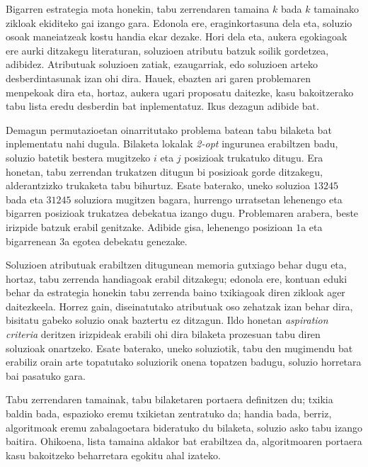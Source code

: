 \documentclass[eu]{ifirak}\usepackage[]{graphicx}\usepackage[]{color}
\begin{document}
Bigarren estrategia mota honekin, tabu zerrendaren tamaina $k$ bada $k$ tamainako zikloak ekiditeko gai izango gara. Edonola ere, eraginkortasuna dela eta, soluzio osoak maneiatzeak kostu handia ekar dezake. Hori dela eta, aukera egokiagoak ere aurki ditzakegu literaturan, soluzioen atributu batzuk soilik gordetzea, adibidez. Atributuak soluzioen zatiak, ezaugarriak, edo soluzioen arteko desberdintasunak izan ohi dira. Hauek, ebazten ari garen problemaren menpekoak dira eta, hortaz, aukera ugari proposatu daitezke, kasu bakoitzerako tabu lista eredu desberdin bat inplementatuz. Ikus dezagun adibide bat.

\begin{tcolorbox}
\begin{ifexample}
Demagun permutazioetan oinarritutako problema batean tabu bilaketa bat inplementatu nahi dugula. Bilaketa lokalak {\em 2-opt} ingurunea erabiltzen badu, soluzio batetik bestera mugitzeko $i$ eta $j$ posizioak trukatuko ditugu. Era honetan, tabu zerrendan trukatzen ditugun bi posizioak gorde ditzakegu, alderantzizko trukaketa tabu bihurtuz. Esate baterako, uneko soluzioa $13245$ bada eta $31245$ soluziora mugitzen bagara, hurrengo urratsetan lehenengo eta bigarren posizioak trukatzea debekatua izango dugu. Problemaren arabera, beste irizpide batzuk erabil genitzake. Adibide gisa, lehenengo posizioan $1$a eta bigarrenean $3$a egotea debekatu genezake.
\end{ifexample}
\end{tcolorbox}

Soluzioen atributuak erabiltzen ditugunean memoria gutxiago behar dugu eta, hortaz, tabu zerrenda handiagoak erabil ditzakegu; edonola ere, kontuan eduki behar da estrategia honekin tabu zerrenda baino txikiagoak diren zikloak ager daitezkeela. Horrez gain, diseinatutako atributuak oso zehatzak izan behar dira, bisitatu gabeko soluzio onak baztertu ez ditzagun. Ildo honetan \textit{aspiration criteria} deritzen irizpideak erabili ohi dira bilaketa prozesuan tabu  diren soluzioak onartzeko. Esate baterako, uneko soluziotik, tabu den mugimendu bat erabiliz orain arte topatutako soluziorik onena topatzen badugu, soluzio horretara bai pasatuko gara.

Tabu zerrendaren tamainak, tabu bilaketaren portaera definitzen du; txikia baldin bada, espazioko eremu txikietan zentratuko da; handia bada, berriz, algoritmoak eremu zabalagoetara bideratuko du bilaketa, soluzio asko tabu izango baitira. Ohikoena, lista tamaina aldakor bat erabiltzea da, algoritmoaren portaera kasu bakoitzeko beharretara egokitu ahal izateko.
\end{document}
